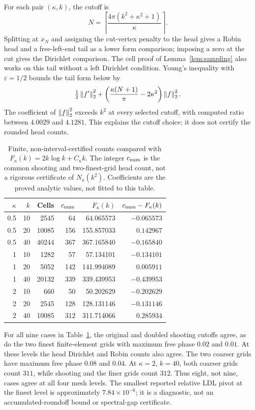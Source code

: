 For each pair $(\kappa,k)$, the cutoff is
\[
N=\left\lceil\frac{4\pi(k^2+\kappa^2+1)}{\kappa}\right\rceil.
\]
Splitting at $x_N$ and assigning the cut-vertex penalty
to the head gives a Robin head and a free-left-end tail
as a lower form comparison; imposing a zero at the cut
gives the Dirichlet comparison.
The cell proof of Lemma~\ref{lem:sampling} also works
on this tail without a left Dirichlet condition.
Young's inequality with $\varepsilon=1/2$ bounds the
tail form below by
\[
\tfrac12\left\lVert f'\right\rVert_2^2+
\left(\frac{\kappa(N+1)}{\pi}-2\kappa^2\right)\left\lVert f\right\rVert_2^2.
\]
The coefficient of $\left\lVert f\right\rVert_2^2$ exceeds $k^2$ at
every selected cutoff, with computed ratio between
$4.0029$ and $4.1281$.
This explains the cutoff choice; it does not certify
the rounded head counts.

\begin{table}[tb]
\centering
\small
\begin{tabular}{rrrrrr}
\toprule
$\kappa$ & $k$ & Cells & $c_{\rm num}$ &
$F_\kappa(k)$ & $c_{\rm num}-F_\kappa(k)$\\
\midrule
0.5 & 10 & 2545  & 64  & 64.065573  & $-0.065573$\\
0.5 & 20 & 10085 & 156 & 155.857033 & $ 0.142967$\\
0.5 & 40 & 40244 & 367 & 367.165840 & $-0.165840$\\
1   & 10 & 1282  & 57  & 57.134101  & $-0.134101$\\
1   & 20 & 5052  & 142 & 141.994089 & $ 0.005911$\\
1   & 40 & 20132 & 339 & 339.439953 & $-0.439953$\\
2   & 10 & 660   & 50  & 50.202629  & $-0.202629$\\
2   & 20 & 2545  & 128 & 128.131146 & $-0.131146$\\
2   & 40 & 10085 & 312 & 311.714066 & $ 0.285934$\\
\bottomrule
\end{tabular}
\caption{Finite, non-interval-certified counts compared with
$F_\kappa(k)=2k\log k+C_\kappa k$.
The integer $c_{\rm num}$ is the common shooting and
two-finest-grid head count, not a rigorous certificate
of $N_\kappa(k^2)$.
Coefficients are the proved analytic values, not fitted
to this table.}
\label{tab:checks}
\end{table}

For all nine cases in Table~\ref{tab:checks}, the
original and doubled shooting cutoffs agree, as do the
two finest finite-element grids with maximum free phase
$0.02$ and $0.01$.
At these levels the head Dirichlet and Robin counts
also agree.
The two coarser grids have maximum free phase $0.08$
and $0.04$.
At $\kappa=2$, $k=40$, both coarser grids count
$311$, while shooting and the finer grids count
$312$.
Thus eight, not nine, cases agree at all four mesh levels.
The smallest reported relative LDL pivot at the
finest level is approximately $7.84\times10^{-6}$;
it is a diagnostic, not an accumulated-roundoff bound
or spectral-gap certificate.


